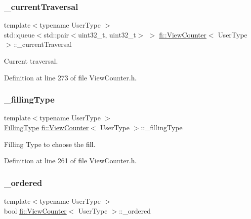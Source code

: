 \subsubsection{\texorpdfstring{\+\_\+current\+Traversal}{\_currentTraversal}}
{\footnotesize\ttfamily template$<$typename User\+Type $>$ \\
std\+::queue$<$std\+::pair$<$uint32\+\_\+t, uint32\+\_\+t$>$ $>$ \hyperlink{classfi_1_1ViewCounter}{fi\+::\+View\+Counter}$<$ User\+Type $>$\+::\+\_\+current\+Traversal\hspace{0.3cm}{\ttfamily [private]}}



Current traversal. 



Definition at line 273 of file View\+Counter.\+h.

\mbox{\label{classfi_1_1ViewCounter_a1b73e5b8d05eeaec0ff50ae5f53fb405}} 
\subsubsection{\texorpdfstring{\+\_\+filling\+Type}{\_fillingType}}
{\footnotesize\ttfamily template$<$typename User\+Type $>$ \\
\hyperlink{namespacefi_a6808b618c85d179a330ca388162215bd}{Filling\+Type} \hyperlink{classfi_1_1ViewCounter}{fi\+::\+View\+Counter}$<$ User\+Type $>$\+::\+\_\+filling\+Type\hspace{0.3cm}{\ttfamily [private]}}



Filling Type to choose the fill. 



Definition at line 261 of file View\+Counter.\+h.

\mbox{\label{classfi_1_1ViewCounter_a0dfcb4d800a0d80591e4e6d34b148731}} 
\subsubsection{\texorpdfstring{\+\_\+ordered}{\_ordered}}
{\footnotesize\ttfamily template$<$typename User\+Type $>$ \\
bool \hyperlink{classfi_1_1ViewCounter}{fi\+::\+View\+Counter}$<$ User\+Type $>$\+::\+\_\+ordered\hspace{0.3cm}{\ttfamily [private]}}



